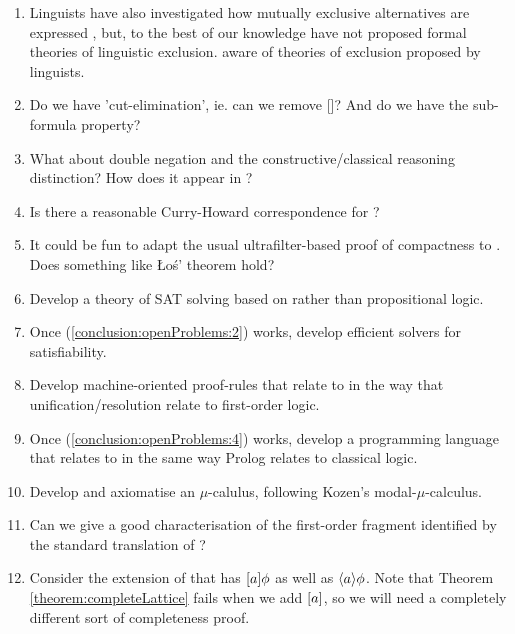 \begin{enumerate}

\item Linguists have also investigated how mutually exclusive
  alternatives are expressed \cite[Chapter ??? See John's email]{OKeeffeA:rouhanocl}, but, to the best of our knowledge  have not proposed
  formal theories of linguistic exclusion.
  aware of theories of exclusion proposed by linguists.

\item Do we have 'cut-elimination', ie. can we remove
  []?  And do we have the sub-formula property?

\item What about double negation and the constructive/classical
  reasoning distinction?  How does it appear in \ELABR{}?

\item Is there a reasonable Curry-Howard correspondence for \ELFULL{}?

\item It could be fun to adapt the usual ultrafilter-based proof of compactness 
  to \ELABR{}. Does something like \L{}o\'{s}' theorem hold?

\item\label{conclusion:openProblems:2}  Develop a theory of SAT solving based on \ELABR{} rather than
  propositional logic.

\item Once (\ref{conclusion:openProblems:2}) works, develop efficient
  solvers for \ELABR{} satisfiability.

\item\label{conclusion:openProblems:4} Develop machine-oriented proof-rules that relate to \ELABR{}
  in the way that unification/resolution relate to first-order logic.

\item Once (\ref{conclusion:openProblems:4}) works, develop a
  programming language that relates to \ELABR{} in the same way
  Prolog relates to classical logic.

\item Develop and axiomatise an \ELABR{} $\mu$-calulus, following
  Kozen's modal-$\mu$-calculus.

\item Can we give a good characterisation of the first-order fragment
  identified by the standard translation of \ELFULL{}?
  
  \item Consider the extension of \ELABR{} that has $[ a ] \phi$ as well as $\langle a \rangle \phi$.
  Note that Theorem \ref{theorem:completeLattice} fails when we add $\MUST{a}$, so we will need a completely different sort of completeness proof.

\end{enumerate}

